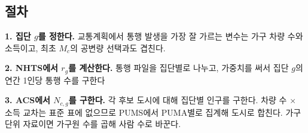 \documentclass[10pt,a4paper]{article}
\begin{document}
\subsection{절차}

\textbf{1. 집단 $g$를 정한다.} 교통계획에서 통행 발생을 가장 잘 가르는 변수는 가구 차량 수와 소득이고, 최초 $M_c$의 공변량 선택과도 겹친다. 

\textbf{2. NHTS에서 $r_g$를 계산한다.} 통행 파일을 집단별로 나누고, 가중치를 써서 집단 $g$의 연간 1인당 통행 수를 구한다

\textbf{3. ACS에서 $N_{c,g}$를 구한다.} 각 후보 도시에 대해 집단별 인구를 구한다. 차량 수 $\times$ 소득 교차는 표준 표에 없으므로 PUMS에서 PUMA별로 집계해 도시로 합친다. 가구 단위 자료이면 가구원 수를 곱해 사람 수로 바꾼다.

\end{document}
